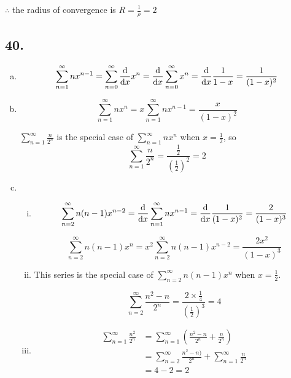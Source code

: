 \documentclass{article}
\begin{document}
    $\therefore$ the radius of convergence is $R = \frac 1 \rho = 2$

    \subsection*{40.}

    \begin{enumerate}[(a)]
        \item 
        $$\sum_{n=1}^\infty nx^{n-1} = \sum_{n=0}^\infty \frac{\textrm d}{\textrm dx}x^n = \frac{\textrm d}{\textrm dx}\sum_{n=0}^\infty x^n = \frac{\textrm d}{\textrm dx} \frac{1}{1-x} = \frac{1}{(1-x)^2}$$

        \item 
        $$\sum_{n=1}^\infty nx^n = x \sum_{n=1}^\infty nx^{n-1} = \frac{x}{(1-x)^2}$$

        $\sum_{n=1}^\infty \frac{n}{2^n}$ is the special case of $\sum_{n=1}^\infty nx^n$ when $x = \frac 1 2$, so $$\sum_{n=1}^\infty \frac{n}{2^n} = \frac{\frac 1 2}{(\frac 1 2)^2} = 2$$

        \item 

        \begin{enumerate}[(i)]
            \item 
            $$\sum_{n=2}^\infty n(n-1)x^{n-2} = \frac{\textrm d}{\textrm dx} \sum_{n=1}^\infty nx^{n-1} = \frac{\textrm d}{\textrm dx} \frac{1}{(1-x)^2} = \frac{2}{(1-x)^3}$$

            $$\sum_{n=2}^\infty n(n-1)x^{n} = x^2 \sum_{n=2}^\infty n(n-1)x^{n-2} = \frac{2x^2}{(1-x)^3}$$

            \item 

            This series is the special case of $\sum_{n=2}^\infty n(n-1)x^{n}$ when $x = \frac 1 2$.

            $$\sum_{n=2}^\infty \frac{n^2 - n}{2^n} = \frac{2 \times \frac 1 4}{(\frac 1 2 )^3} = 4 $$

            \item 

            $$\begin{aligned}
                \sum_{n=1}^\infty \frac{n^2}{2^n} &= \sum_{n=1}^\infty (\frac{n^2 - n}{2^n} + \frac{n}{2^n}) \\
                &= \sum_{n=2}^\infty \frac{n^2-n)}{2^n} + \sum_{n=1}^\infty \frac{n}{2^n} \\
                &= 4 - 2 = 2
            \end{aligned}$$
        \end{enumerate}
    \end{enumerate}
\end{document}
